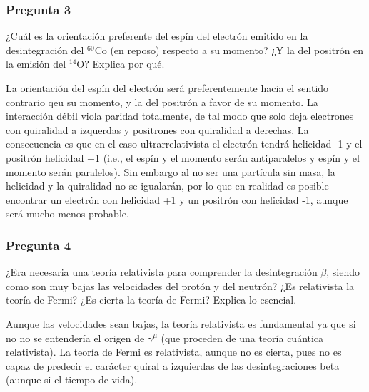 \begin{Enunciado}
	\subsubsection*{Pregunta 3}

	¿Cuál es la orientación preferente del espín del electrón emitido en la desintegración del $^{60}$Co (en reposo) respecto a su momento? ¿Y la del positrón en la emisión del $^{14}$O? Explica por qué.

\end{Enunciado}

La orientación del espín del electrón será preferentemente hacia el sentido contrario qeu su momento, y la del positrón a favor de su momento. La interacción débil viola paridad totalmente, de tal modo que solo deja electrones con quiralidad a izquerdas y positrones con quiralidad a derechas. La consecuencia es que en el caso ultrarrelativista el electrón tendrá helicidad -1 y el positrón helicidad +1 (i.e., el espín y el momento serán antiparalelos y espín y el momento serán paralelos). Sin embargo al no ser una partícula sin masa, la helicidad y la quiralidad no se igualarán, por lo que en realidad es posible encontrar un electrón con helicidad +1 y un positrón con helicidad -1, aunque será mucho menos probable.

\vspace*{2em}

\begin{Enunciado}
	\subsubsection*{Pregunta 4}

	¿Era necesaria una teoría relativista para comprender la desintegración $\beta$, siendo como son muy bajas las velocidades del protón y del neutrón? ¿Es relativista la teoría de Fermi? ¿Es cierta la teoría de Fermi? Explica lo esencial.

\end{Enunciado}

Aunque las velocidades sean bajas, la teoría relativista es fundamental ya que si no no se entendería el origen de $\gamma^\mu$ (que proceden de una teoría cuántica relativista). La teoría de Fermi es relativista, aunque no es cierta, pues no es capaz de predecir el carácter quiral a izquierdas de las desintegraciones beta (aunque si el tiempo de vida).

\vspace*{2em}

